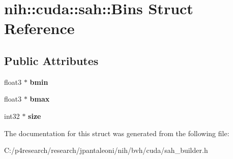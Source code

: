 \hypertarget{structnih_1_1cuda_1_1sah_1_1_bins}{
\section{nih\-:\-:cuda\-:\-:sah\-:\-:\-Bins \-Struct \-Reference}
\label{structnih_1_1cuda_1_1sah_1_1_bins}
}
\subsection*{\-Public \-Attributes}
\begin{DoxyCompactItemize}
\item 
\hypertarget{structnih_1_1cuda_1_1sah_1_1_bins_a1d6393400801094d517a421c31cdefc3}{
float3 $\ast$ {\bfseries bmin}}
\label{structnih_1_1cuda_1_1sah_1_1_bins_a1d6393400801094d517a421c31cdefc3}

\item 
\hypertarget{structnih_1_1cuda_1_1sah_1_1_bins_a8aefd1cf7d81965ca5ac1d31dd8c07c2}{
float3 $\ast$ {\bfseries bmax}}
\label{structnih_1_1cuda_1_1sah_1_1_bins_a8aefd1cf7d81965ca5ac1d31dd8c07c2}

\item 
\hypertarget{structnih_1_1cuda_1_1sah_1_1_bins_aac1f8944e8692600f9fe1e164061f6e3}{
int32 $\ast$ {\bfseries size}}
\label{structnih_1_1cuda_1_1sah_1_1_bins_aac1f8944e8692600f9fe1e164061f6e3}

\end{DoxyCompactItemize}


\-The documentation for this struct was generated from the following file\-:\begin{DoxyCompactItemize}
\item 
\-C\-:/p4research/research/jpantaleoni/nih/bvh/cuda/sah\-\_\-builder.\-h\end{DoxyCompactItemize}
